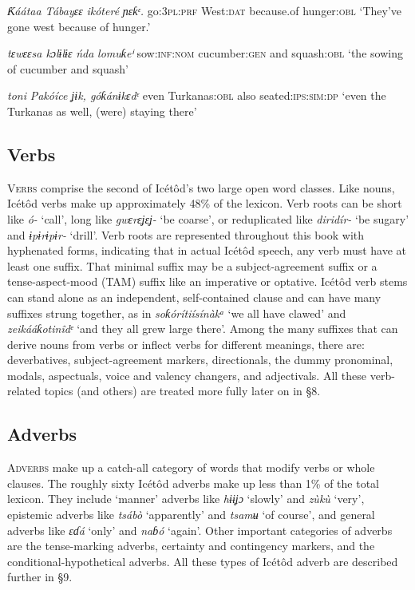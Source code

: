 \textit{Ƙáátaa   Tábayɛɛ   }\textit{ikóteré}\textit{   ɲɛƙᵋ.}
go:\textsc{3pl:prf}   West:\textsc{dat}   because.of   hunger:\textsc{obl}
‘They’ve gone west because of hunger.’




\textit{tɛwɛɛsa     kɔlɨlɨɛ       }\textit{ńda}\textit{   lomuƙeⁱ}
sow:\textsc{inf:nom}   cucumber:\textsc{gen}   and   squash:\textsc{obl}
‘the sowing of cucumber and squash’




\textit{toni}\textit{   Pakóíce     ʝɨk,   góƙánɨkɛdᵋ}
even  Turkanas:\textsc{obl}   also   seated:\textsc{ips:sim:dp}
‘even the Turkanas as well, (were) staying there’






\subsection{Verbs}


\textsc{Verbs} comprise the second of Icétôd’s two large open word classes. Like nouns, Icétôd verbs make up approximately 48\% of the lexicon. Verb roots can be short like \textit{ó- }‘call’, long like \textit{gwɛrɛʝɛʝ- }‘be coarse’, or reduplicated like \textit{diridír- }‘be sugary’ and \textit{ɨpɨrɨpɨr- }‘drill’. Verb roots are represented throughout this book with hyphenated forms, indicating that in actual Icétôd speech, any verb must have at least one suffix. That minimal suffix may be a subject-agreement suffix or a tense-aspect-mood (TAM) suffix like an imperative or optative. Icétôd verb stems can stand alone as an independent, self-contained clause and can have many suffixes strung together, as in \textit{soƙórítiísínàkᵃ }‘we all have clawed’ and \textit{zeikááƙotinîdᵉ }‘and they all grew large there’. Among the many suffixes that can derive nouns from verbs or inflect verbs for different meanings, there are: deverbatives, subject-agreement markers, directionals, the dummy pronominal, modals, aspectuals, voice and valency changers, and adjectivals. All these verb-related topics (and others) are treated more fully later on in §8.




\subsection{Adverbs}


\textsc{Adverbs} make up a catch-all category of words that modify verbs or whole clauses. The roughly sixty Icétôd adverbs make up less than 1\% of the total lexicon. They include ‘manner’ adverbs like \textit{hɨɨʝɔ }‘slowly’ and \textit{zùkù }‘very’, epistemic adverbs like \textit{tsábò }‘apparently’ and \textit{tsamʉ }‘of course’, and general adverbs like \textit{ɛɗá }‘only’ and \textit{naɓó }‘again’. Other important categories of adverbs are the tense-marking adverbs, certainty and contingency markers, and the conditional-hypothetical adverbs. All these types of Icétôd adverb are described further in §9.




